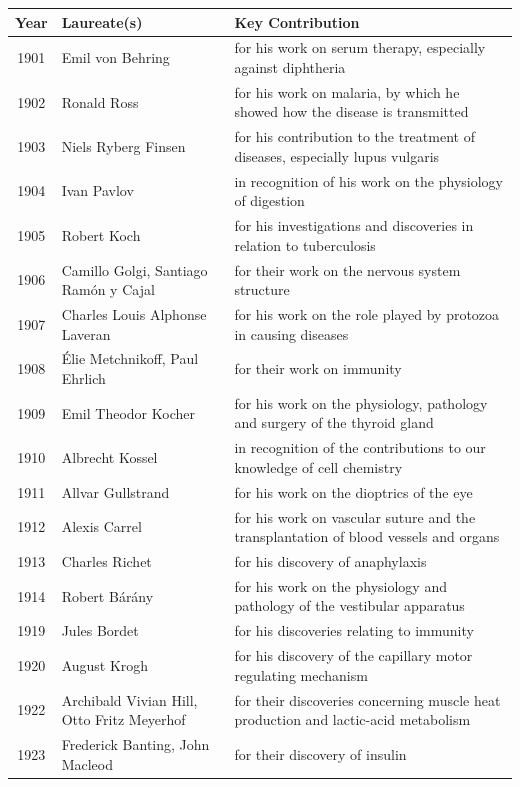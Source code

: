 \documentclass[12pt,a4paper]{book}
\def\textbf#1{#1}
\begin{document}
{\small
\begin{longtable}{cp{3.2cm}p{5.5cm}}
\toprule
\textbf{Year} & \textbf{Laureate(s)} & \textbf{Key Contribution} \\
\midrule
\endhead
1901 & Emil von Behring & for his work on serum therapy, especially against diphtheria \\
1902 & Ronald Ross & for his work on malaria, by which he showed how the disease is transmitted \\
1903 & Niels Ryberg Finsen & for his contribution to the treatment of diseases, especially lupus vulgaris \\
1904 & Ivan Pavlov & in recognition of his work on the physiology of digestion \\
1905 & Robert Koch & for his investigations and discoveries in relation to tuberculosis \\
1906 & Camillo Golgi, Santiago Ram\'on y Cajal & for their work on the nervous system structure \\
1907 & Charles Louis Alphonse Laveran & for his work on the role played by protozoa in causing diseases \\
1908 & Élie Metchnikoff, Paul Ehrlich & for their work on immunity \\
1909 & Emil Theodor Kocher & for his work on the physiology, pathology and surgery of the thyroid gland \\
1910 & Albrecht Kossel & in recognition of the contributions to our knowledge of cell chemistry \\
1911 & Allvar Gullstrand & for his work on the dioptrics of the eye \\
1912 & Alexis Carrel & for his work on vascular suture and the transplantation of blood vessels and organs \\
1913 & Charles Richet & for his discovery of anaphylaxis \\
1914 & Robert B\'ar\'any & for his work on the physiology and pathology of the vestibular apparatus \\
1919 & Jules Bordet & for his discoveries relating to immunity \\
1920 & August Krogh & for his discovery of the capillary motor regulating mechanism \\
1922 & Archibald Vivian Hill, Otto Fritz Meyerhof & for their discoveries concerning muscle heat production and lactic-acid metabolism \\
1923 & Frederick Banting, John Macleod & for their discovery of insulin \\

\end{longtable}}
\end{document}
